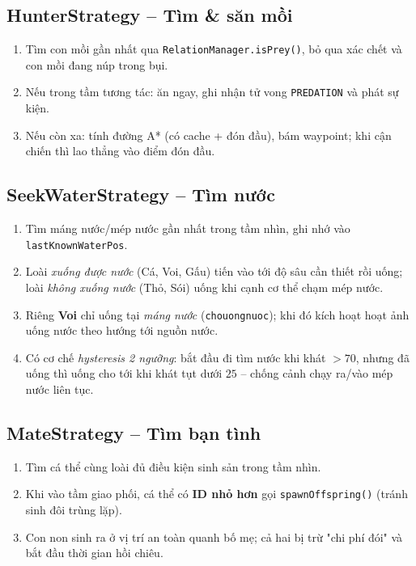\documentclass[12pt,a4paper]{report}
\newcommand{\code}[1]{\texttt{\small #1}}
\begin{document}
\subsection{HunterStrategy -- Tìm \& săn mồi}
\begin{enumerate}[leftmargin=2em]
    \item Tìm con mồi gần nhất qua \code{RelationManager.isPrey()}, bỏ qua xác chết và con mồi đang núp trong bụi.
    \item Nếu trong tầm tương tác: ăn ngay, ghi nhận tử vong \code{PREDATION} và phát sự kiện.
    \item Nếu còn xa: tính đường A* (có cache + đón đầu), bám waypoint; khi cận chiến thì lao thẳng vào điểm đón đầu.
\end{enumerate}

\subsection{SeekWaterStrategy -- Tìm nước}
\begin{enumerate}[leftmargin=2em]
    \item Tìm máng nước/mép nước gần nhất trong tầm nhìn, ghi nhớ vào \code{lastKnownWaterPos}.
    \item Loài \textit{xuống được nước} (Cá, Voi, Gấu) tiến vào tới độ sâu cần thiết rồi uống; loài \textit{không xuống nước} (Thỏ, Sói) uống khi cạnh cơ thể chạm mép nước.
    \item Riêng \textbf{Voi} chỉ uống tại \textit{máng nước} (\code{chouongnuoc}); khi đó kích hoạt hoạt ảnh uống nước theo hướng tới nguồn nước.
    \item Có cơ chế \textit{hysteresis 2 ngưỡng}: bắt đầu đi tìm nước khi khát $>70$, nhưng đã uống thì uống cho tới khi khát tụt dưới $25$ -- chống cảnh chạy ra/vào mép nước liên tục.
\end{enumerate}

\subsection{MateStrategy -- Tìm bạn tình}
\begin{enumerate}[leftmargin=2em]
    \item Tìm cá thể cùng loài đủ điều kiện sinh sản trong tầm nhìn.
    \item Khi vào tầm giao phối, cá thể có \textbf{ID nhỏ hơn} gọi \code{spawnOffspring()} (tránh sinh đôi trùng lặp).
    \item Con non sinh ra ở vị trí an toàn quanh bố mẹ; cả hai bị trừ "chi phí đói" và bắt đầu thời gian hồi chiêu.
\end{enumerate}
\end{document}
